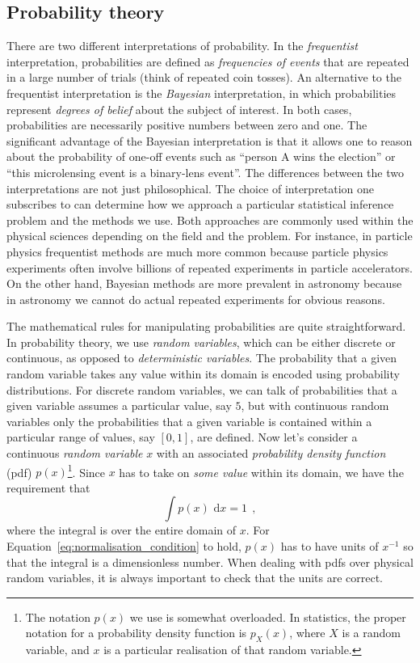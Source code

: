\documentclass[12pt,dvipsnames]{report}
\newcommand{\ud}{\,\mathrm{d}}
\newcommand{\hquad}{~~}
\begin{document}
\subsection{Probability theory}
There are two different interpretations of probability. In the
\emph{frequentist} interpretation, probabilities are defined as \emph{frequencies of
    events} that are repeated in a large number of trials (think of  repeated
coin tosses). An alternative to the frequentist interpretation is the
\emph{Bayesian} interpretation, in which probabilities represent \emph{degrees
    of belief} about the subject of interest. In both cases, probabilities are
necessarily positive numbers between zero and one. The significant advantage of the
Bayesian interpretation is that it allows one to reason about the probability
of one-off events such as ``person A wins the election'' or ``this microlensing
event is a binary-lens event''. The differences between the two interpretations
are not just philosophical. The choice of interpretation one subscribes to can
determine how we approach a particular statistical inference problem and
the methods we use. Both approaches are commonly used within the
physical sciences depending on the field and the problem. For instance,
in particle physics frequentist methods are much more common because
particle physics experiments often involve billions of repeated experiments in
particle accelerators. On the other hand, Bayesian methods are more prevalent in
astronomy because in astronomy we cannot do actual repeated experiments for obvious reasons.

The mathematical rules for manipulating probabilities are quite
straightforward. In probability theory, we use \emph{random variables}, which can
be either discrete or continuous, as opposed to \emph{deterministic variables}. 
The probability  that a given random variable takes any value within its domain is encoded 
using probability distributions.
For discrete random variables, we can talk of probabilities that a given
variable assumes a particular value, say $5$, but with continuous random
variables only the probabilities that a given variable is contained within
a particular range of values, say $[0,1]$, are defined. 
Now let's consider a continuous
\emph{random variable} $x$ with an associated \emph{probability density function}
(pdf) $p(x)$\footnote{The notation $p(x)$ we use is somewhat overloaded. In
    statistics, the proper notation for a probability density function is
    $p_{X}(x)$, where $X$ is a random variable, and $x$ is a particular realisation
    of that random variable.}. Since $x$ has to take on \emph{some value} within
its domain, we have the requirement that
\begin{equation}
    \int p(x)\,\ud x=1
    \hquad,
    \label{eq:normalisation_condition}
\end{equation}
where the integral is over the entire domain of $x$.
For Equation~\ref{eq:normalisation_condition} to hold,
$p(x)$ has to have units of $x^{-1}$ so that
the integral is a dimensionless number. When dealing with pdfs over physical random 
variables, it is always important to check that the units are correct.
\end{document}
